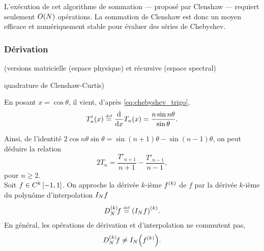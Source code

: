 L'exécution de cet algorithme de sommation --- proposé par Clenshaw \cite{clenshaw1955} --- requiert seulement $\bigO{N}$ opérations. %
La sommation de Clenshaw est donc un moyen efficace et numériquement stable pour évaluer des séries de Chebyshev.

\subsubsection{Dérivation}
(versions matricielle (espace physique) et récursive (espace spectral)\par
quadrature de Clenshaw-Curtis)\par

En posant $x = \cos\theta$, il vient, d'après \eqref{eq:chebyshev_trigo},
\begin{equation}
	T_n'(x) \defini{=} \dfdx{T_n(x)}{x} = \frac{n \sin n\theta}{\sin \theta}.
\end{equation}

Ainsi, de l'identité $2 \cos n \theta \sin \theta = \sin(n+1)\theta - \sin(n-1)\theta$, on peut déduire la relation 
\begin{equation}
	2 T_n = \frac{T'_{n+1}}{n+1} - \frac{T'_{n-1}}{n-1} ,
	\label{eq:chebyshev_relation_deriv_3termes}
\end{equation}
pour $n \geq 2$.
\\
Soit $f \in \contdiff{k}\chebinterval$.
On approche la dérivée $k$-ième $\deriv{f}{k}$ de $f$ par la dérivée $k$-ième du polynôme d'interpolation $\interpolant{f}{N}$
\begin{equation}
	\interpderiv{f}{N}{k} \defini{=} \deriv{ \left( \interpolant{f}{N} \right) }{k}.
	\label{eq:chebyshev_def_interpderiv}
\end{equation}
En général, les opérations de dérivation et d'interpolation ne commutent pas, \ie
\begin{equation}
	\interpderiv{f}{N}{k} \neq \interpolant{ \left( \deriv{f}{k} \right) }{N}.
\end{equation}

